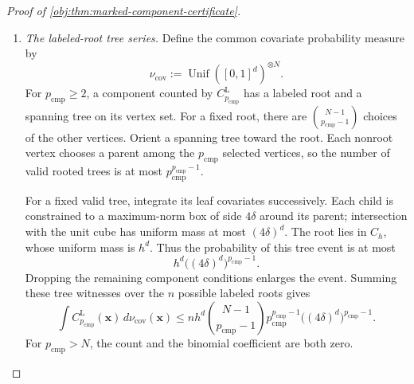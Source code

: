 \begin{proof}[Proof of \cref{obj:thm:marked-component-certificate}]
\begin{enumerate}
Set
\[
c_I:=\min\{c_H,c_U\}.
\]
Its amplitude conditions permit both the component bound and the uninformative-component equalities. A component containing a labeled record and having size less than two has size one, so its distance is zero by singleton cancellation. A component containing no labeled record is auxiliary-only, so its distance is also zero. Define the informative component counts, for every integer \(p_{\mathrm{cmp}}\ge0\), by
\[
C_{p_{\mathrm{cmp}}}^{\mathrm L}(\mathbf x)
:=
\#\left\{
\mathcal V\in\mathscr K_{\mathbf x}:
|\mathcal V|=p_{\mathrm{cmp}},\
\mathcal V\cap\{1,\ldots,n\}\ne\varnothing
\right\}.
\]
Regrouping the remaining component sum by size gives
\[
\int(\sqrt{g_{+1}}-\sqrt{g_{-1}})^2\,d\mu_{\mathrm{spin}}
\le
K_{\mathrm{info}}a^2b^2
\sum_{p_{\mathrm{cmp}}=2}^{N}
(9/2)^{p_{\mathrm{cmp}}}
p_{\mathrm{cmp}}^4C_{p_{\mathrm{cmp}}}^{\mathrm L}(\mathbf x).
\]
The graph \(\mathscr G_{\mathbf x}\) is exactly the graph in the statement: it retains all \(N\) vertices, including the exterior singleton components, whose density factors equal one.

\item \textit{The labeled-root tree series.}
Define the common covariate probability measure by
\[
\nu_{\mathrm{cov}}
:=
\operatorname{Unif}([0,1]^d)^{\otimes N}.
\]
For \(p_{\mathrm{cmp}}\ge2\), a component counted by
\(C_{p_{\mathrm{cmp}}}^{\mathrm L}\) has a labeled root and a spanning tree on its vertex set. For a fixed root, there are
\(\binom{N-1}{p_{\mathrm{cmp}}-1}\) choices of the other vertices. Orient a spanning tree toward the root. Each nonroot vertex chooses a parent among the \(p_{\mathrm{cmp}}\) selected vertices, so the number of valid rooted trees is at most
\(p_{\mathrm{cmp}}^{p_{\mathrm{cmp}}-1}\).

For a fixed valid tree, integrate its leaf covariates successively. Each child is constrained to a maximum-norm box of side \(4\delta\) around its parent; intersection with the unit cube has uniform mass at most \((4\delta)^d\). The root lies in \(C_h\), whose uniform mass is \(h^d\). Thus the probability of this tree event is at most
\[
h^d\bigl((4\delta)^d\bigr)^{p_{\mathrm{cmp}}-1}.
\]
Dropping the remaining component conditions enlarges the event. Summing these tree witnesses over the \(n\) possible labeled roots gives
\[
\int C_{p_{\mathrm{cmp}}}^{\mathrm L}(\mathbf x)\,
d\nu_{\mathrm{cov}}(\mathbf x)
\le
nh^d
\binom{N-1}{p_{\mathrm{cmp}}-1}
p_{\mathrm{cmp}}^{p_{\mathrm{cmp}}-1}
\bigl((4\delta)^d\bigr)^{p_{\mathrm{cmp}}-1}.
\]
For \(p_{\mathrm{cmp}}>N\), the count and the binomial coefficient are both zero.


\end{enumerate}
\end{proof}
